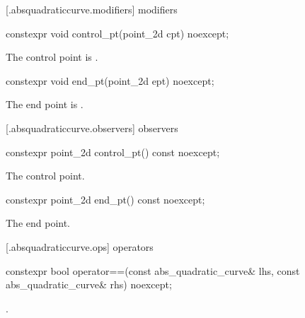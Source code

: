  [\iotwod.absquadraticcurve.modifiers]{ modifiers}

%
\begin{itemdecl}
constexpr void control_pt(point_2d cpt) noexcept;
\end{itemdecl}
\begin{itemdescr}
\pnum
\effects
The control point is .
\end{itemdescr}

%
\begin{itemdecl}
constexpr void end_pt(point_2d ept) noexcept;
\end{itemdecl}
\begin{itemdescr}
\pnum
\effects
The end point is .
\end{itemdescr}

 [\iotwod.absquadraticcurve.observers]{ observers}

%
\begin{itemdecl}
constexpr point_2d control_pt() const noexcept;
\end{itemdecl}
\begin{itemdescr}
\pnum
\returns
The control point.
\end{itemdescr}

%
\begin{itemdecl}
constexpr point_2d end_pt() const noexcept;
\end{itemdecl}
\begin{itemdescr}
\pnum
\returns
The end point.
\end{itemdescr}

 [\iotwod.absquadraticcurve.ops]{ operators}

%
\begin{itemdecl}
constexpr bool operator==(const abs_quadratic_curve& lhs,
  const abs_quadratic_curve& rhs) noexcept;
\end{itemdecl}
\begin{itemdescr}
\pnum
\returns
{}.
\end{itemdescr}
